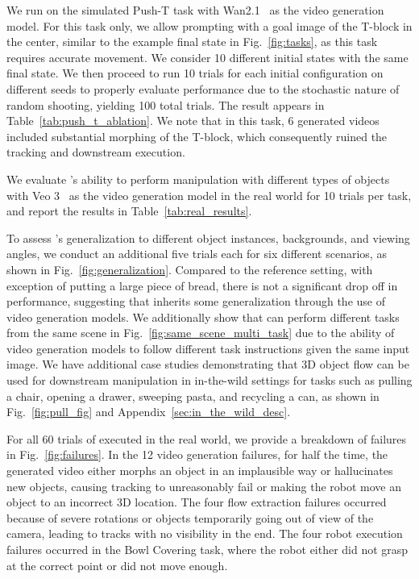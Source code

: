 We run \algo on the simulated Push-T task with Wan2.1~\cite{wan2025} as the video generation model. For this task only, we allow prompting with a goal image of the T-block in the center, similar to the example final state in Fig.~\ref{fig:tasks}, as this task requires accurate movement. We consider 10 different initial states with the same final state. We then proceed to run 10 trials for each initial configuration on different seeds to properly evaluate performance due to the stochastic nature of random shooting, yielding 100 total trials. The result appears in Table~\ref{tab:push_t_ablation}. We note that in this task, 6 generated videos included substantial morphing of the T-block, which consequently ruined the tracking and downstream execution. 

We evaluate \algo's ability to perform manipulation with different types of objects with Veo 3~\cite{Veo3TechReport2025} as the video generation model in the real world for 10 trials per task, and report the results in Table~\ref{tab:real_results}. 

To assess \algo's generalization to different object instances, backgrounds, and viewing angles, we conduct an additional five trials each for six different scenarios, as shown in Fig.~\ref{fig:generalization}. Compared to the reference setting, with exception of putting a large piece of bread, there is not a significant drop off in performance, suggesting that \algo inherits some generalization through the use of video generation models. We additionally show that \algo can perform different tasks from the same scene in Fig.~\ref{fig:same_scene_multi_task} due to the ability of video generation models to follow different task instructions given the same input image. We have additional case studies demonstrating that 3D object flow can be used for downstream manipulation in in-the-wild settings for tasks such as pulling a chair, opening a drawer, sweeping pasta, and recycling a can, as shown in Fig.~\ref{fig:pull_fig} and Appendix~\ref{sec:in_the_wild_desc}.

For all 60 trials of \algo executed in the real world, we provide a breakdown of failures in Fig.~\ref{fig:failures}. In the 12 video generation failures, for half the time, the generated video either morphs an object in an implausible way or hallucinates new objects, causing tracking to unreasonably fail or making the robot move an object to an incorrect 3D location. The four flow extraction failures occurred because of severe rotations or objects temporarily going out of view of the camera, leading to tracks with no visibility in the end. The four robot execution failures occurred in the Bowl Covering task, where the robot either did not grasp at the correct point or did not move enough.

